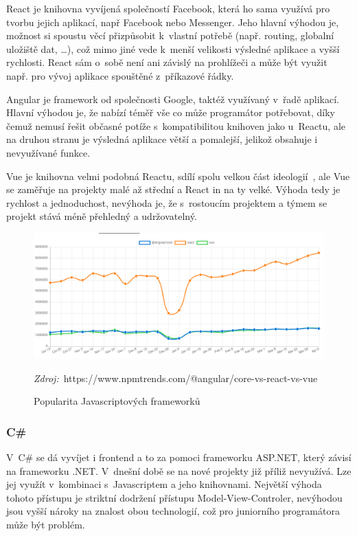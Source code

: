 React je knihovna vyvíjená společností Facebook, která ho sama využívá pro tvorbu jejich aplikací, např Facebook nebo Messenger. Jeho hlavní výhodou je, možnost si spoustu věcí přizpůsobit k~vlastní potřebě (např. routing, globalní uložiště dat, \ldots{}), což mimo jiné vede k~menší velikosti výsledné aplikace a vyšší rychlosti. React sám o~sobě není ani závislý na prohlížeči a může být využit např. pro vývoj aplikace spouštěné z~příkazové řádky.

Angular je framework od společnosti Google, taktéž využívaný v~řadě aplikací. Hlavní výhodou je, že nabízí téměř vše co může programátor potřebovat, díky čemuž nemusí řešit občasné potíže s~kompatibilitou knihoven jako u~Reactu, ale na druhou stranu je výsledná aplikace větší a pomalejší, jelikož obsahuje i nevyužívané funkce.

Vue je knihovna velmi podobná Reactu, sdílí spolu velkou část ideologií~\cite{you_2014_comparison}, ale Vue se zaměřuje na projekty malé až střední a React in na ty velké. Výhoda tedy je rychlost a jednoduchost, nevýhoda je, že s~rostoucím projektem a týmem se projekt stává méně přehledný a udržovatelný.

\begin{figure}[h!]
    \centering
    \includegraphics[width=\textwidth]{assets/popularity_plot.png}
    \caption{Popularita Javascriptových frameworků}
    \label{fig:popularity_plot}
    \textit{Zdroj:}~https://www.npmtrends.com/@angular/core-vs-react-vs-vue
\end{figure}

\subsubsection*{C\# }
V~C\# se dá vyvíjet i frontend a to za pomoci frameworku ASP.NET, který závisí na frameworku .NET. V~dnešní době se na nové projekty již příliž nevyužívá. Lze jej využít v~kombinaci s~Javascriptem a jeho knihovnami. Největší výhoda tohoto přístupu je striktní dodržení přístupu Model-View-Controler, nevýhodou jsou vyšší nároky na znalost obou technologií, což pro juniorního programátora může být problém.

